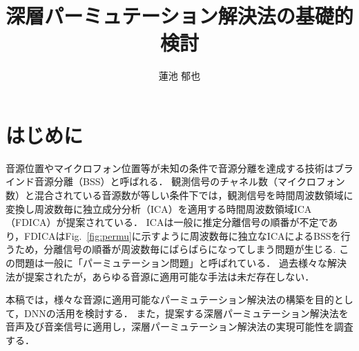 \documentclass[a4j]{jsarticle}
\title{深層パーミュテーション解決法の基礎的検討}
\author{蓮池 郁也}
\begin{document}
\maketitle%



\thispagestyle{empty}
\pagestyle{empty}

\section{はじめに}
音源位置やマイクロフォン位置等が未知の条件で音源分離を達成する技術はブラインド音源分離（BSS）と呼ばれる．
観測信号のチャネル数（マイクロフォン数）と混合されている音源数が等しい条件下では，観測信号を時間周波数領域に変換し周波数毎に独立成分分析（ICA）\cite{ICA}を適用する時間周波数領域ICA（FDICA）\cite{FDICA}が提案されている．
ICAは一般に推定分離信号の順番が不定であり，FDICAはFig.~\ref{fig:permu}に示すように周波数毎に独立なICAによるBSSを行うため，分離信号の順番が周波数毎にばらばらになってしまう問題が生じる.
この問題は一般に「パーミュテーション問題」と呼ばれている．
過去様々な解決法が提案されたが，あらゆる音源に適用可能な手法は未だ存在しない．

本稿では，様々な音源に適用可能なパーミュテーション解決法の構築を目的として，DNNの活用を検討する．
また，提案する深層パーミュテーション解決法を音声及び音楽信号に適用し，深層パーミュテーション解決法の実現可能性を調査する．

\end{document}
